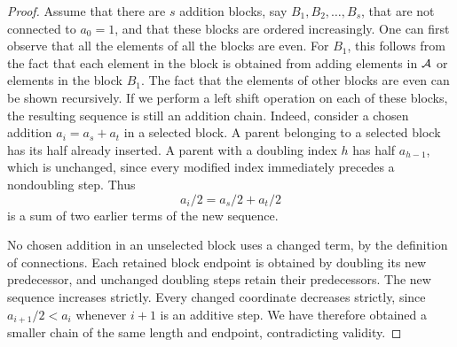 \documentclass{article}
\theoremstyle{definition}
\begin{document}
\begin{proof} Assume that there are $s$ addition blocks, say $B_1,B_2,\ldots, B_s$, that are not connected to $a_0=1$, and that these blocks are ordered increasingly. One can first observe that all the elements of all the blocks are even. For $B_1$, this follows from the fact that each element in the block is obtained from adding elements in ${\cal A}$ or elements in the block $B_1$. The fact that the elements of other blocks are even can be shown recursively. If we perform a left shift operation on each of these blocks,
the resulting sequence is still an addition chain. Indeed, consider a chosen addition $a_i=a_s+a_t$ in a selected block. A parent belonging to a selected block has its half already inserted. A parent with a doubling index $h$ has half $a_{h-1}$,
which is unchanged, since every modified index immediately precedes a nondoubling step. Thus
$$
a_i/2=a_s/2+a_t/2
$$
is a sum of two earlier terms of the new sequence.

No chosen addition in an unselected block uses a changed term, by the definition of connections. Each retained block endpoint is obtained by doubling its new predecessor, and unchanged
doubling steps retain their predecessors. The new sequence increases strictly. Every changed coordinate decreases strictly, since $a_{i+1}/2<a_i$ whenever $i+1$ is an additive step. We have therefore obtained a smaller chain of the same length and endpoint, contradicting validity.
\end{proof}



\end{document}
